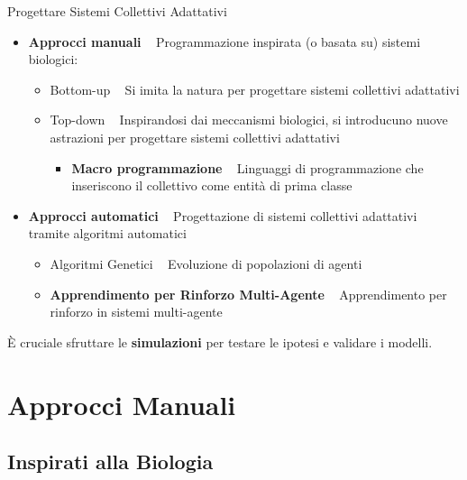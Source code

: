 \documentclass[presentation, 10pt,aspectratio=169]{beamer}\mode<presentation>{\usetheme{AMSBolognaFC}}
\begin{document}
\begin{frame}{Progettare Sistemi Collettivi Adattativi}
	\begin{itemize}
		\item \textbf{Approcci manuali} \faArrowRight ~ Programmazione inspirata (o basata su) sistemi biologici:
		\begin{itemize}
			\item \alert{Bottom-up} \faArrowRight ~ Si imita la natura per progettare sistemi collettivi adattativi
			\item \alert{Top-down} \faArrowRight ~ Inspirandosi dai meccanismi biologici, si introducuno nuove astrazioni per progettare sistemi collettivi adattativi
			\begin{itemize}
				\item \textbf{Macro programmazione} \faArrowRight ~ Linguaggi di programmazione che inseriscono il collettivo come entità di prima classe
			\end{itemize}
		\end{itemize}
		\item \textbf{Approcci automatici} \faArrowRight ~ Progettazione di sistemi collettivi adattativi tramite algoritmi automatici
		\begin{itemize}
			\item \alert{Algoritmi Genetici} \faArrowRight ~ Evoluzione di popolazioni di agenti
			\item \textbf{Apprendimento per Rinforzo Multi-Agente} \faArrowRight ~ Apprendimento per rinforzo in sistemi multi-agente
		\end{itemize}
	\end{itemize}

	È cruciale sfruttare le \alert{\textbf{simulazioni}} per testare le ipotesi e validare i modelli.
\end{frame}
\section{Approcci Manuali}


\subsection{Inspirati alla Biologia}
\end{document}
